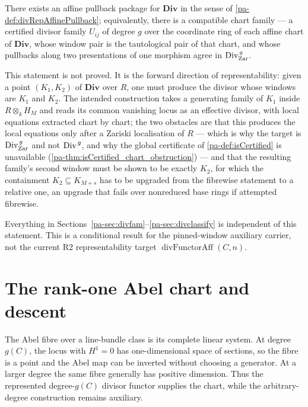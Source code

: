 \begin{theorem}
  \label{pa-thm:divRepUniversalFamily}
  \notready
  There exists an affine pullback package for \(\mathbf{Div}\) in the sense of
  \ref{pa-def:divRepAffinePullback}; equivalently, there is a compatible chart family --- a
  certified divisor family \(U_{ij}\) of degree \(g\) over the coordinate ring of each
  affine chart of \(\mathbf{Div}\), whose window pair is the tautological pair of that
  chart, and whose pullbacks along two presentations of one morphism agree in
  \(\operatorname{Div}^{\,g}_{\mathrm{Zar}}\).

  This statement is not proved. It is the forward direction of representability: given a
  point \((K_1, K_2)\) of \(\mathbf{Div}\) over \(R\), one must produce the divisor whose
  windows are \(K_1\) and \(K_2\). The intended construction takes a generating family of
  \(K_1\) inside \(R \otimes_k H_M\) and reads its common vanishing locus as an effective
  divisor, with local equations extracted chart by chart; the two obstacles are that this
  produces the local equations only after a Zariski localisation of \(R\) --- which is why
  the target is \(\operatorname{Div}^{\,g}_{\mathrm{Zar}}\) and not \(\operatorname{Div}^{\,g}\), and why the global
  certificate of \ref{pa-def:isCertified} is unavailable
  (\ref{pa-thm:isCertified_chart_obstruction}) --- and that the resulting family's second
  window must be shown to be exactly \(K_2\), for which the containment
  \(K_2 \subseteq K_{M+s}\) has to be upgraded from the fibrewise statement to a relative
  one, an upgrade that fails over nonreduced base rings if attempted fibrewise.

  Everything in Sections~\ref{pa-sec:divfam}--\ref{pa-sec:divclassify} is independent of this
  statement. This is a conditional result for the pinned-window auxiliary carrier, not the
  current R2 representability target \(\operatorname{divFunctorAff}(C,n)\).
\end{theorem}

\section{The rank-one Abel chart and descent}
\label{pa-sec:rankOneAbelDescent}

The Abel fibre over a line-bundle class is its complete linear system.  At degree \(g(C)\),
the locus with \(H^1=0\) has one-dimensional space of sections, so the fibre is a point and
the Abel map can be inverted without choosing a generator.  At a larger degree the same
fibre generally has positive dimension.  Thus the represented degree-\(g(C)\) divisor
functor supplies the chart, while the arbitrary-degree construction remains auxiliary.


